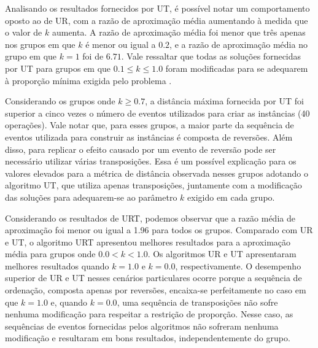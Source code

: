 Analisando os resultados fornecidos por UT, é possível notar um comportamento oposto ao de UR, com a razão de aproximação média aumentando à medida que o valor de $k$ aumenta. A razão de aproximação média foi menor que três apenas nos grupos em que $k$ é menor ou igual a $0.2$, e a razão de aproximação média no grupo em que $k = 1$ foi de $6.71$. Vale ressaltar que todas as soluções fornecidas por UT para grupos em que $0.1 \le k \le 1.0$ foram modificadas para se adequarem à proporção mínima exigida pelo problema \SbPRT.

Considerando os grupos onde $k \ge 0.7$, a distância máxima fornecida por UT foi superior a cinco vezes o número de eventos utilizados para criar as instâncias (40 operações). Vale notar que, para esses grupos, a maior parte da sequência de eventos utilizada para construir as instâncias é composta de reversões. Além disso, para replicar o efeito causado por um evento de reversão pode ser necessário utilizar várias transposições. Essa é um possível explicação para os valores elevados para a métrica de distância observada nesses grupos adotando o algoritmo UT, que utiliza apenas transposições, juntamente com a modificação das soluções para adequarem-se ao parâmetro $k$ exigido em cada grupo. 

Considerando os resultados de URT, podemos observar que a razão média de aproximação foi menor ou igual a 1.96 para todos os grupos. Comparado com UR e UT, o algoritmo URT apresentou melhores resultados para a aproximação média para grupos onde $0.0 < k < 1.0$. Os algoritmos UR e UT apresentaram melhores resultados quando $k = 1.0$ e $k = 0.0$, respectivamente. O desempenho superior de UR e UT nesses cenários particulares ocorre porque a sequência de ordenação, composta apenas por reversões, encaixa-se perfeitamente no caso em que $k = 1.0$ e, quando $k = 0.0$, uma sequência de transposições não sofre nenhuma modificação para respeitar a restrição de proporção. Nesse caso, as sequências de eventos fornecidas pelos algoritmos não sofreram nenhuma modificação e resultaram em bons resultados, independentemente do grupo.

